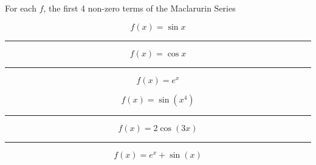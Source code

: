 \documentclass{article}
\begin{document}
\begin{landscape}
\thispagestyle{empty}
\begin{center}

{\Huge For each $f$, the first 4 non-zero terms of the Maclarurin Series}

\end{center}
\begin{multicols}{2}

{\Huge


$$
f(x) = \sin x 
$$

\vspace{0.5in}
\hrule
\vspace{0.5in}

$$
f(x) = \cos x 
$$

\vspace{0.5in}
\hrule
\vspace{0.5in}

$$
f(x) = e^x 
$$

\columnbreak


$$
f(x) = \sin (x^4)
$$

\vspace{0.5in}
\hrule
\vspace{0.5in}

$$
f(x) = 2\cos (3x) 
$$

\vspace{0.5in}
\hrule
\vspace{0.5in}

$$
f(x) = e^x + \sin(x)
$$

}

\end{multicols}
\end{landscape}
\end{document}
